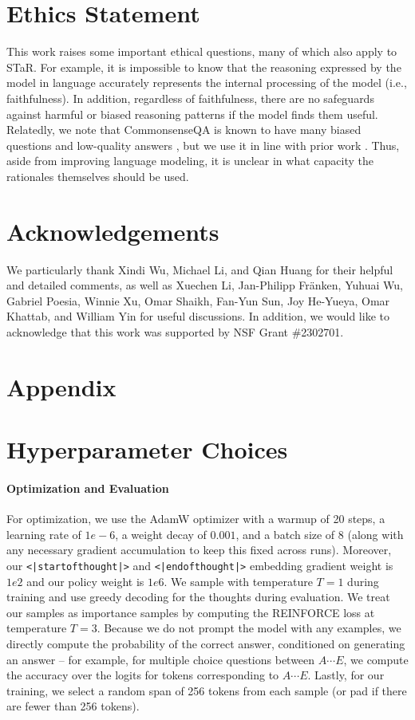 \documentclass{article} %
\begin{document}
\section*{Ethics Statement}
This work raises some important ethical questions, many of which also apply to STaR. For example, it is impossible to know that the reasoning expressed by the model in language accurately represents the internal processing of the model (i.e., faithfulness). In addition, regardless of faithfulness, there are no safeguards against harmful or biased reasoning patterns if the model finds them useful. Relatedly, we note that CommonsenseQA is known to have many biased questions and low-quality answers \citep{geva2019we}, but we use it in line with prior work \citep{zelikman2022star,goyal2023think}. Thus, aside from improving language modeling, it is unclear in what capacity the rationales themselves should be used.

\section*{Acknowledgements}
We particularly thank Xindi Wu, Michael Li, and Qian Huang for their helpful and detailed comments, as well as Xuechen Li, Jan-Philipp Fr\"anken, Yuhuai Wu, Gabriel Poesia, Winnie Xu, Omar Shaikh, Fan-Yun Sun, Joy He-Yueya, Omar Khattab, and William Yin for useful discussions. In addition, we would like to acknowledge that this work was supported by NSF Grant \#2302701.




\appendix
\section*{Appendix}

\section{Hyperparameter Choices}
\label{app:hyperparams}
\paragraph{Optimization and Evaluation}
For optimization, we use the AdamW optimizer with a warmup of 20 steps, a learning rate of $1e-6$, a weight decay of $0.001$, and a batch size of $8$ (along with any necessary gradient accumulation to keep this fixed across runs). Moreover, our \lstinline{<|startofthought|>} and \lstinline{<|endofthought|>} embedding gradient weight is $1e2$ and our policy weight is $1e6$. We sample with temperature $T=1$ during training and use greedy decoding for the thoughts during evaluation. We treat our samples as importance samples by computing the REINFORCE loss at temperature $T=3$. Because we do not prompt the model with any examples, we directly compute the probability of the correct answer, conditioned on generating an answer -- for example, for multiple choice questions between $A \cdots E$, we compute the accuracy over the logits for tokens corresponding to $A \cdots E$. Lastly, for our training, we select a random span of 256 tokens from each sample (or pad if there are fewer than 256 tokens).
\end{document}
